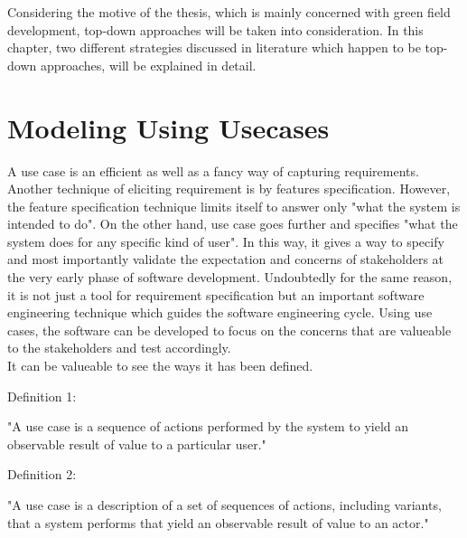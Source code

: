Considering the motive of the thesis, which is mainly concerned with green field development, top-down approaches will be taken into consideration. In this chapter, two different strategies discussed in literature which happen to be top-down approaches, will be explained in detail.

\section{Modeling Using Usecases}\label{section:selection_by_use_case/use_case}
A use case is an efficient as well as a fancy way of capturing requirements. Another technique of eliciting requirement is by features specification. However, the feature specification technique limits itself to answer only "what the system is intended to do". On the other hand, use case goes further and specifies "what the system does for any specific kind of user". In this way, it gives a way to specify and most importantly validate the expectation and concerns of stakeholders at the very early phase of software development. Undoubtedly for the same reason, it is not just a tool for requirement specification but an important software engineering technique which guides the software engineering cycle. Using use cases, the software can be developed to focus on the concerns that are valueable to the stakeholders and test accordingly.\cite{Ng:2004aa}
\\
It can be valueable to see the ways it has been defined.
\begin{shaded}Definition 1: \cite{Jacobson:1987aa} \end{shaded}
"A use case is a sequence of actions performed by the system to yield an observable result of value to a particular user." 
\\
\begin{shaded}Definition 2: \cite{Rumbaugh:1999aa}\end{shaded}
"A use case is a description of a set of sequences of actions, including variants, that a system performs that yield an observable result of value to an actor."

